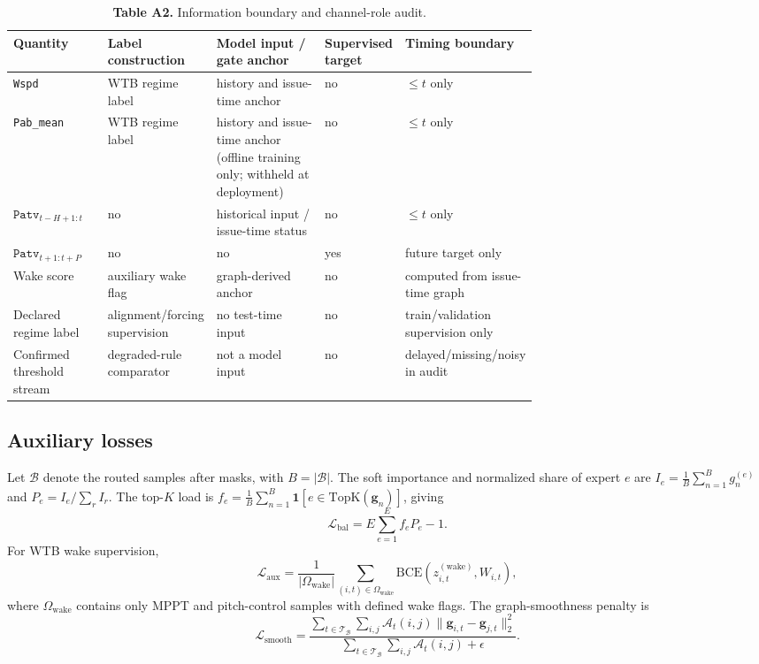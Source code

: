 \documentclass[
  journal]{IEEEtran}
\begin{document}
\begin{table}[!t]
\centering
\fontsize{8.0pt}{9.6pt}\selectfont
\setlength{\tabcolsep}{2.6pt}
\renewcommand{\arraystretch}{1.05}
\caption*{\textbf{Table A2.} Information boundary and channel-role audit.}
\begin{tabularx}{\linewidth}{>{\raggedright\arraybackslash}p{0.18\linewidth} >{\raggedright\arraybackslash}p{0.18\linewidth} >{\raggedright\arraybackslash}X >{\raggedright\arraybackslash}p{0.15\linewidth} >{\raggedright\arraybackslash}p{0.18\linewidth}}
\toprule
Quantity & Label construction & Model input / gate anchor & Supervised target & Timing boundary \\
\midrule
\texttt{Wspd} & WTB regime label & history and issue-time anchor & no & $\leq t$ only \\
\texttt{Pab\_mean} & WTB regime label & history and issue-time anchor (offline training only; withheld at deployment) & no & $\leq t$ only \\
$\texttt{Patv}_{t-H+1:t}$ & no & historical input / issue-time status & no & $\leq t$ only \\
$\texttt{Patv}_{t+1:t+P}$ & no & no & yes & future target only \\
Wake score & auxiliary wake flag & graph-derived anchor & no & computed from issue-time graph \\
Declared regime label & alignment/forcing supervision & no test-time input & no & train/validation supervision only \\
Confirmed threshold stream & degraded-rule comparator & not a model input & no & delayed/missing/noisy in audit \\
\bottomrule
\end{tabularx}
\end{table}

\FloatBarrier

\subsection*{Auxiliary losses}\label{auxiliary-losses}

Let \(\mathcal{B}\) denote the routed samples after masks, with
\(B=|\mathcal{B}|\). The soft importance and normalized share of expert
\(e\) are \(I_e = \frac{1}{B}\sum_{n=1}^{B} g_n^{(e)}\) and
\(P_e = I_e / \sum_{r} I_r\). The top-\(K\) load is
\(f_e = \frac{1}{B}\sum_{n=1}^{B}\mathbf{1}[e \in \mathrm{TopK}(\mathbf{g}_n)]\),
giving \[\mathcal{L}_{\mathrm{bal}} = E\sum_{e=1}^{E} f_e P_e - 1.\] For
WTB wake supervision,
\[\mathcal{L}_{\mathrm{aux}} = \frac{1}{|\Omega_{\mathrm{wake}}|}\sum_{(i,t)\in\Omega_{\mathrm{wake}}}\mathrm{BCE}(z^{(\mathrm{wake})}_{i,t}, W_{i,t}),\]
where \(\Omega_{\mathrm{wake}}\) contains only MPPT and pitch-control
samples with defined wake flags. The graph-smoothness penalty is
\[\mathcal{L}_{\mathrm{smooth}} = \frac{\sum_{t\in\mathcal{T}_{\mathcal{B}}}\sum_{i,j}\mathcal{A}_t(i,j)\lVert\mathbf{g}_{i,t}-\mathbf{g}_{j,t}\rVert_2^2}{\sum_{t\in\mathcal{T}_{\mathcal{B}}}\sum_{i,j}\mathcal{A}_t(i,j)+\epsilon}.\]
\end{document}

